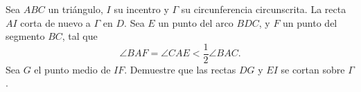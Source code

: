 Sea $ABC$ un triángulo, $I$ su incentro y $\Gamma$ su circunferencia circunscrita. La recta $AI$ corta de nuevo a $\Gamma$ en $D$. Sea $E$ un punto del arco $BDC$, y $F$ un punto del segmento $BC$, tal que \[\angle BAF=\angle CAE < \dfrac12\angle BAC.\] Sea $G$ el punto medio de $IF$. Demuestre que las rectas $DG$ y $EI$ se cortan sobre $\Gamma$.